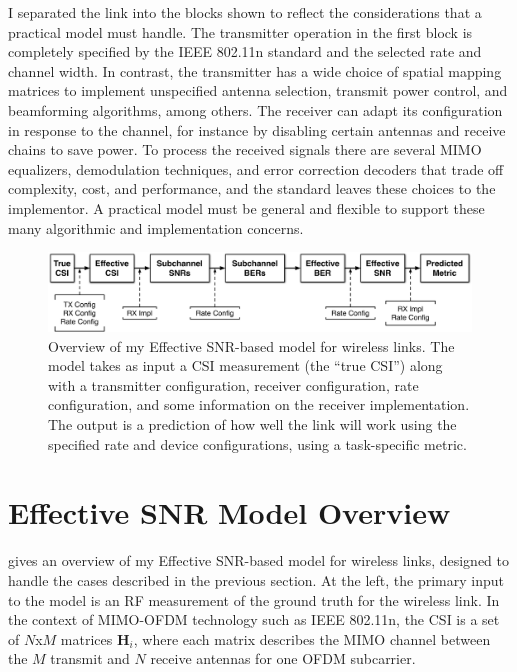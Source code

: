 I separated the link into the blocks shown to reflect the considerations that a practical model must handle. The transmitter operation in the first block is completely specified by the IEEE 802.11n standard and the selected rate and channel width. In contrast, the transmitter has a wide choice of spatial mapping matrices to implement unspecified antenna selection, transmit power control, and beamforming algorithms, among others. The receiver can adapt its configuration in response to the channel, for instance by disabling certain antennas and receive chains to save power. To process the received signals there are several MIMO equalizers, demodulation techniques, and error correction decoders that trade off complexity, cost, and performance, and the standard leaves these choices to the implementor. A practical model must be general and flexible to support these many algorithmic and implementation concerns.

\begin{figure}[ht]
\centering
\includegraphics[width=\textwidth]{figures/model/esnr_model_overview_jz.pdf}
\caption[Model overview]{\label{fig:model_overview}Overview of my Effective SNR-based model for wireless links. The model takes as input a CSI measurement (the ``true CSI'') along with a transmitter configuration, receiver configuration, rate configuration, and some information on the receiver implementation. The output is a prediction of how well the link will work using the specified rate and device configurations, using a task-specific metric.}
\end{figure}

\section{Effective SNR Model Overview}
\label{sec:model_overview}
 gives an overview of my Effective SNR-based model for wireless links, designed to handle the cases described in the previous section. At the left, the primary input to the model is an RF measurement of the ground truth  for the wireless link. In the context of MIMO-OFDM technology such as IEEE 802.11n, the CSI is a set of $N$x$M$ matrices $\mathbf{H}_i$, where each matrix describes the MIMO channel between the $M$ transmit and $N$ receive antennas for one OFDM subcarrier.

